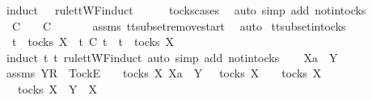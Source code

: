 \ {\isacharparenleft}induct\ {\isasymrho}{\isacharprime}\ {\isasymrho}\ rule{\isacharcolon}ttWF{}{\isachardot}induct{\isacharparenright}\isanewline
\ \ \ \ \isamarkupfalse%
\ tocks{\isachardot}cases\ \isamarkupfalse%
\ {\isacharparenleft}auto\ simp\ add{\isacharcolon}\ notin{\isacharunderscore}tocks{\isacharparenright}\isanewline
\ \ \isamarkupfalse%
\ \isamarkupfalse%
\ {\isachardoublequoteopen}{\isasymrho}{\isacharprime}\ {\isasymsubseteq}\isactrlsub C\ {\isasymrho}\ {\isasymand}\ {\isasymsigma}{\isacharprime}\ {\isasymsubseteq}\isactrlsub C\ {\isasymsigma}{\isachardoublequoteclose}\isanewline
\ \ \ \ \isamarkupfalse%
\ assms{\isacharparenleft}{}{\isacharparenright}\ tt{\isacharunderscore}subset{\isacharunderscore}remove{\isacharunderscore}start\ \isamarkupfalse%
\ auto\isanewline
{}\isamarkupfalse%
%
\endisatagproof
{\isafoldproof}%
%
\isadelimproof
\isanewline
%
\endisadelimproof
\isanewline
{}\isamarkupfalse%
\ tt{\isacharunderscore}subset{\isacharunderscore}in{\isacharunderscore}tocks{\isacharcolon}\isanewline
\ \ {\isachardoublequoteopen}t\ {\isasymin}\ tocks\ X\ {\isasymLongrightarrow}\ t{\isacharprime}\ {\isasymsubseteq}\isactrlsub C\ t\ {\isasymLongrightarrow}\ t{\isacharprime}\ {\isasymin}\ tocks\ X{\isachardoublequoteclose}\isanewline
%
\isadelimproof
%
\endisadelimproof
%
\isatagproof
{}\isamarkupfalse%
\ {\isacharparenleft}induct\ t{\isacharprime}\ t\ rule{\isacharcolon}ttWF{}{\isachardot}induct{\isacharcomma}\ auto\ simp\ add{\isacharcolon}\ notin{\isacharunderscore}tocks{\isacharparenright}\isanewline
\ \ \isamarkupfalse%
\ Xa\ {\isasymrho}\ Y\ {\isasymsigma}\isanewline
\ \ \isamarkupfalse%
\ assms{\isacharcolon}\ {\isachardoublequoteopen}{\isacharbrackleft}Y{\isacharbrackright}\isactrlsub R\ {\isacharhash}\ {\isacharbrackleft}Tock{\isacharbrackright}\isactrlsub E\ {\isacharhash}\ {\isasymsigma}\ {\isasymin}\ tocks\ X{\isachardoublequoteclose}\ {\isachardoublequoteopen}Xa\ {\isasymsubseteq}\ Y{\isachardoublequoteclose}\ {\isachardoublequoteopen}{\isasymsigma}\ {\isasymin}\ tocks\ X\ {\isasymLongrightarrow}\ {\isasymrho}\ {\isasymin}\ tocks\ X{\isachardoublequoteclose}\isanewline
\ \ \isamarkupfalse%
\ \isamarkupfalse%
\ {\isachardoublequoteopen}{\isasymsigma}\ {\isasymin}\ tocks\ X\ {\isasymand}\ Y\ {\isasymsubseteq}\ X{\isachardoublequoteclose}\isanewline
\ \ \ \ \isamarkupfalse%
